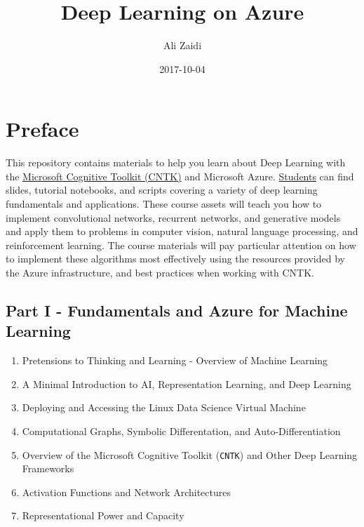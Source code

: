 \documentclass[]{book}
\title{Deep Learning on Azure}
\author{Ali Zaidi}
\date{2017-10-04}
\providecommand{\tightlist}{%
  \setlength{\itemsep}{0pt}\setlength{\parskip}{0pt}}
\theoremstyle{definition}
\theoremstyle{definition}
\theoremstyle{definition}
\theoremstyle{remark}
\begin{document}
\maketitle

{
\setcounter{tocdepth}{1}
\tableofcontents
}
\chapter{Preface}\label{preface}

This repository contains materials to help you learn about Deep Learning
with the \href{https://github.com/microsoft/cntk}{Microsoft Cognitive
Toolkit (CNTK)} and Microsoft Azure. \href{./Students}{Students} can
find slides, tutorial notebooks, and scripts covering a variety of deep
learning fundamentals and applications. These course assets will teach
you how to implement convolutional networks, recurrent networks, and
generative models and apply them to problems in computer vision, natural
language processing, and reinforcement learning. The course materials
will pay particular attention on how to implement these algorithms most
effectively using the resources provided by the Azure infrastructure,
and best practices when working with CNTK.

\section{Part I - Fundamentals and Azure for Machine
Learning}\label{part-i---fundamentals-and-azure-for-machine-learning}

\begin{enumerate}
\def\labelenumi{\arabic{enumi}.}
\tightlist
\item
  Pretensions to Thinking and Learning - Overview of Machine Learning
\item
  A Minimal Introduction to AI, Representation Learning, and Deep
  Learning
\item
  Deploying and Accessing the Linux Data Science Virtual Machine
\item
  Computational Graphs, Symbolic Differentation, and
  Auto-Differentiation
\item
  Overview of the Microsoft Cognitive Toolkit (\texttt{CNTK}) and Other
  Deep Learning Frameworks
\item
  Activation Functions and Network Architectures
\item
  Representational Power and Capacity
\end{enumerate}
\end{document}
